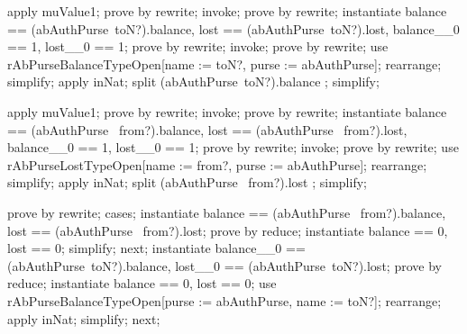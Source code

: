 \begin{LPScript}\begin{zproof}[lAbAuthPurseToTransferOkayMuEquivalence]
    apply muValue1;
    prove by rewrite;
    invoke;
    prove by rewrite;
    instantiate balance == (abAuthPurse~toN?).balance,
        lost == (abAuthPurse~toN?).lost,
        balance\_\_0 == 1, lost\_\_0 == 1;
    prove by rewrite;
    invoke;
    prove by rewrite;
    use rAbPurseBalanceTypeOpen[name := toN?, purse := abAuthPurse];
    rearrange;
    simplify;
    apply inNat;
    split (abAuthPurse~toN?).balance ;
    simplify;
\end{zproof}\end{LPScript}

\begin{LPScript}\begin{zproof}[lAbAuthPurseFromTransferLostMuEquivalence]
    apply muValue1;
    prove by rewrite;
    invoke;
    prove by rewrite;
    instantiate balance == (abAuthPurse~ from?).balance,
        lost == (abAuthPurse~ from?).lost,
        balance\_\_0 == 1, lost\_\_0 == 1;
    prove by rewrite;
    invoke;
    prove by rewrite;
    use rAbPurseLostTypeOpen[name := from?, purse := abAuthPurse];
    rearrange;
    simplify;
    apply inNat;
    split (abAuthPurse~ from?).lost ;
    simplify;
\end{zproof}\end{LPScript}

\begin{LDCheck}\begin{zproof}
    prove by rewrite;
    cases;
    instantiate balance == (abAuthPurse~ from?).balance,
                lost == (abAuthPurse~ from?).lost;
    prove by reduce;
    instantiate balance == 0, lost == 0;
    simplify;
    next;
    instantiate balance\_\_0 == (abAuthPurse~toN?).balance,
                lost\_\_0 == (abAuthPurse~toN?).lost;
    prove by reduce;
    instantiate balance == 0, lost == 0;
    use rAbPurseBalanceTypeOpen[purse := abAuthPurse, name := toN?];
    rearrange;
    apply inNat;
    simplify;
    next;
\end{zproof}\end{LDCheck}

